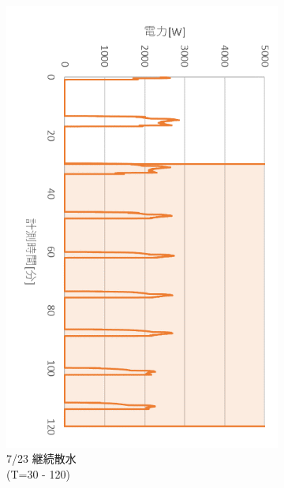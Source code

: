 \documentclass[a4j,fleqn,dvipdfmx,uplatex]{jsarticle}
\begin{document}
\begin{figure}[htb]
\begin{subfigure}[t]{0.32\linewidth}
    \includegraphics[width=\linewidth]{img/t_p/20220723.png}
    \caption{7/23 継続散水\\(T=30 - 120)}\label{fig:e}
  \end{subfigure}
  \begin{subfigure}[t]{0.32\linewidth}
      \centering

\end{subfigure}
\end{figure}
\end{document}
